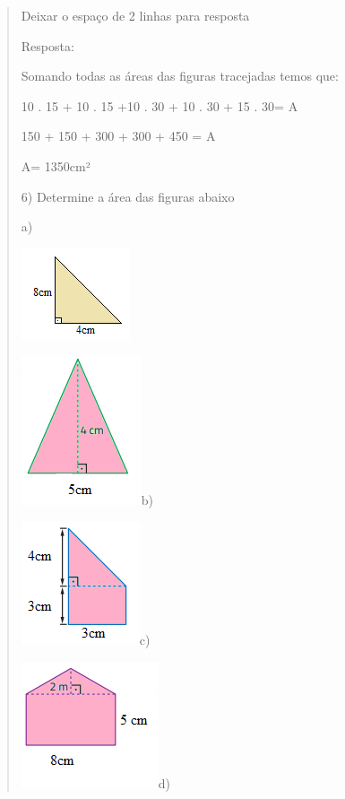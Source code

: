 \begin{quote}
\begin{escolha}
Deixar o espaço de 2 linhas para resposta

Resposta:

Somando todas as áreas das figuras tracejadas temos que:

10 . 15 + 10 . 15 +10 . 30 + 10 . 30 + 15 . 30= A

150 + 150 + 300 + 300 + 450 = A

A= 1350cm²

6) Determine a área das figuras abaixo

a)

\includegraphics[width=1.26042in,height=1.0625in]{./imgSAEB_8_MAT/media/image46.png}

\includegraphics[width=1.39583in,height=1.72917in]{./imgSAEB_8_MAT/media/image47.png}b)

\includegraphics[width=1.375in,height=1.42708in]{./imgSAEB_8_MAT/media/image48.png}c)

\includegraphics[width=1.59375in,height=1.46875in]{./imgSAEB_8_MAT/media/image49.png}d)


\end{escolha}
\end{quote}
